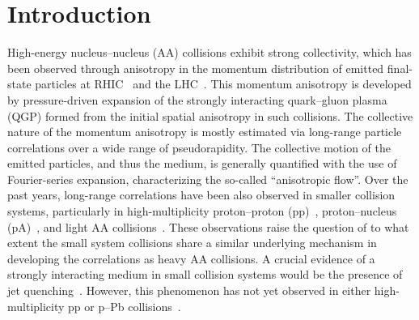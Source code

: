 
\section{Introduction}
\label{sec:intro}

High-energy nucleus--nucleus (AA) collisions exhibit strong collectivity, which has been observed through anisotropy in the momentum distribution of emitted final-state particles at RHIC~\cite{Adams:2005dq,Adcox:2004mh,Arsene:2004fa,Back:2004je} and the LHC~\cite{Abelev:2012di, Abelev:2014pua, ATLAS:2011ah}. This momentum anisotropy is developed by pressure-driven expansion of the strongly interacting quark--gluon plasma (QGP) formed from the initial spatial anisotropy in such collisions.
The collective nature of the momentum anisotropy is mostly estimated via long-range particle correlations over a wide range of pseudorapidity. The collective motion of the emitted particles, and thus the medium, is generally quantified with the use of Fourier-series expansion, characterizing the so-called ``anisotropic flow''\cite{Ollitrault:1992bk}. Over the past years, long-range correlations have been also observed in smaller collision systems, particularly in high-multiplicity proton--proton (pp)~\cite{ATLAS:2015hzw,Khachatryan:2015lva,Khachatryan:2016txc,Acharya:2019vdf,ATLAS:2017rtr}, proton--nucleus (pA)~\cite{ALICE:2012eyl,ATLAS:2014qaj,ATLAS:2016yzd,Khachatryan:2016ibd}, and light AA collisions~\cite{PHENIX:2018lia,Aidala:2017ajz}. These observations raise the question of to what extent the small system collisions share a similar underlying mechanism in developing the correlations as heavy AA collisions.
A crucial evidence of a strongly interacting medium in small collision systems would be the presence of jet quenching~\cite{Gyulassy:1990ye,Wang:1991xy}. However, this phenomenon has not yet observed in either high-multiplicity pp or p--Pb collisions~\cite{Adam:2014qja,Khachatryan:2016odn,Adam:2016jfp,Adam:2016dau,Acharya:2017okq}. %


